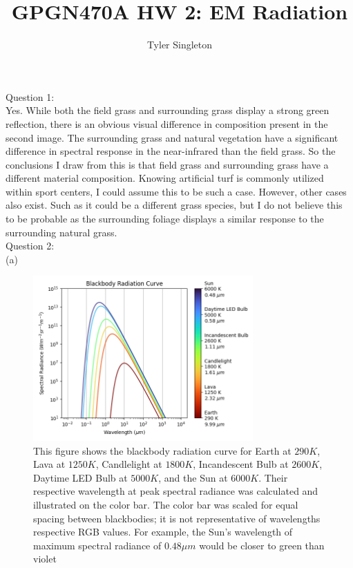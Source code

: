 \documentclass{homework}
\title{GPGN470A HW 2: EM Radiation}
\author{Tyler Singleton}
\begin{document}
\maketitle

Question 1: \\
Yes. While both the field grass and surrounding grass display a strong green reflection, there is an obvious visual difference in composition present in the second image. The surrounding grass and natural vegetation have a significant difference in spectral response in the near-infrared than the field grass. So the conclusions I draw from this is that field grass and surrounding grass have a different material composition. Knowing artificial turf is commonly utilized within sport centers, I could assume this to be such a case. However, other cases also exist. Such as it could be a  different grass species, but I do not believe this to be probable as the surrounding foliage displays a similar response to the surrounding natural grass. \\


Question 2: \\
(a)
\begin{figure}[h]
    \centering
    \includegraphics[width=0.75\textwidth]{Blackbody_Curve.png}
    \caption{This figure shows the blackbody radiation curve for Earth at $290 K$, Lava at $1250 K$, Candlelight at $1800 K$, Incandescent Bulb at $2600 K$, Daytime LED Bulb at $5000 K$, and the Sun at $6000 K$. Their respective wavelength at peak spectral radiance was calculated and illustrated on the color bar. The color bar was scaled for equal spacing between blackbodies; it is not representative of wavelengths respective RGB values. For example, the Sun's wavelength of maximum spectral radiance of $0.48 \mu m$ would be closer to green than violet}
    \label{fig:blackbody}
\end{figure}
\end{document}
